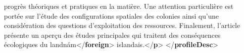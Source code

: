 \begin{shaded}
\hspace*{1em}\hspace*{1em}\hspace*{1em}\hspace*{1em} progrès théoriques et pratiques en la matière.\mbox{}\newline 
\hspace*{1em}\hspace*{1em}\hspace*{1em}\hspace*{1em} Une attention particulière est portée sur\mbox{}\newline 
\hspace*{1em}\hspace*{1em}\hspace*{1em}\hspace*{1em} l’étude des configurations spatiales des\mbox{}\newline 
\hspace*{1em}\hspace*{1em}\hspace*{1em}\hspace*{1em} colonies ainsi qu’une considération des\mbox{}\newline 
\hspace*{1em}\hspace*{1em}\hspace*{1em}\hspace*{1em} questions d’exploitation des ressources.\mbox{}\newline 
\hspace*{1em}\hspace*{1em}\hspace*{1em}\hspace*{1em} Finalement, l’article présente un aperçu des\mbox{}\newline 
\hspace*{1em}\hspace*{1em}\hspace*{1em}\hspace*{1em} études principales qui traitent des\mbox{}\newline 
\hspace*{1em}\hspace*{1em}\hspace*{1em}\hspace*{1em} conséquences écologiques du\mbox{}\newline 
\hspace*{1em}landnám{</\textbf{foreign}>} \mbox{}\newline 
\hspace*{1em}\hspace*{1em}\hspace*{1em}\hspace*{1em} islandais.{</\textbf{p}>}\mbox{}\newline 
{}\mbox{}\newline 
{</\textbf{profileDesc}>}\end{shaded}\egroup\par \par
